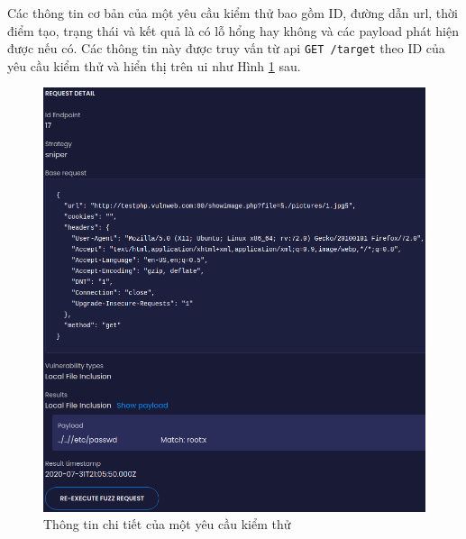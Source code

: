 \FloatBarrier
Các thông tin cơ bản của một yêu cầu kiểm thử bao gồm ID, đường dẫn \acrshort{url}, thời điểm tạo, trạng thái và kết quả là có lỗ hổng hay không và các payload phát hiện được nếu có. Các thông tin này được truy vấn từ \acrshort{api} \colorbox{gray!30}{\texttt{GET /target}} theo ID của yêu cầu kiểm thử và hiển thị trên \acrshort{ui} như Hình \ref{fig:request-detail} sau.
\begin{figure}[H]
  \centering
    \includegraphics[width=1\textwidth,keepaspectratio=true]{images/request-detail.png}
  \caption{Thông tin chi tiết của một yêu cầu kiểm thử}
  \label{fig:request-detail}
\end{figure}
